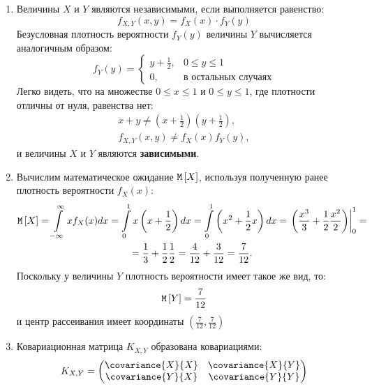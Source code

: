 \documentclass[12pt,a4paper]{article}
\begin{document}
\begin{enumerate}
        \item Величины $X$ и $Y$ являются независимыми, если выполняется равенство:
        \begin{equation}
            f_{X,Y}(x,y) = f_X(x) \cdot f_Y(y)
        \end{equation}
        Безусловная плотность вероятности $f_Y(y)$ величины $Y$ вычисляется аналогичным образом:
        \begin{equation}
            f_Y(y)
            =
            \left \{
            \begin{array}{ll}
                y + \frac{1}{2}, & 0 \le y \le 1              \\
                0,               & \text{в остальных случаях}
            \end{array}
            \right .
        \end{equation}
        Легко видеть, что на множестве $0 \le x \le 1$ и $0 \le y \le 1$, где плотности отличны от нуля, равенства нет:
        \begin{gather}
            x + y \neq \left ( x + \frac{1}{2} \right ) \left ( y + \frac{1}{2} \right ) , \\
            f_{X,Y}(x,y) \neq f_X(x) f_Y(y) ,
        \end{gather}
        и величины $X$ и $Y$ являются \textbf{зависимыми}.

        \item Вычислим математическое ожидание $\mathtt{M} \left [ X \right ]$, используя полученную ранее плотность вероятности $f_X(x)$:
        \begin{multline}
            \expectation{X}
            = \int \limits_{-\infty}^{\infty} x f_X(x) dx
            = \int \limits_0^1 x \left ( x + \frac{1}{2} \right ) dx
            = \int \limits_0^1 \left ( x^2 + \frac{1}{2} x \right ) dx
            = \left . \left ( \frac{x^3}{3} + \frac{1}{2} \frac{x^2}{2} \right ) \right |_0^1 = \\
%
            = \frac{1}{3} + \frac{1}{2} \frac{1}{2}
            = \frac{4}{12} + \frac{3}{12}
            = \frac{7}{12} .
        \end{multline}
        Поскольку у величины $Y$ плотность вероятности имеет такое же вид, то:
        \begin{equation}
            \mathtt{M} \left [ Y \right ] = \frac{7}{12}
        \end{equation}
        и центр рассеивания имеет координаты $\left ( \frac{7}{12}, \frac{7}{12} \right )$

        \item Ковариационная матрица $K_{X,Y}$ образована ковариациями:
        \begin{equation}
            K_{X,Y}
            = \begin{pmatrix}
                  \covariance{X}{X} & \covariance{X}{Y} \\
                  \covariance{Y}{X} & \covariance{Y}{Y}
            \end{pmatrix}
        \end{equation}


\end{enumerate}
\end{document}
